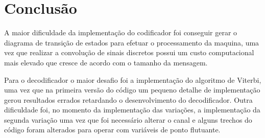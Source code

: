 \section{Conclusão}

A maior dificuldade da implementação do codificador foi conseguir gerar o diagrama de transição de estados para efetuar o processamento da maquina, uma vez que realizar a convolução de sinais discretos possui um custo computacional mais elevado que cresce de acordo com o tamanho da mensagem.

Para o decodificador o maior desafio foi a implementação do algoritmo de Viterbi, uma vez que na primeira versão do código um pequeno detalhe de implementação gerou resultados errados retardando o desenvolvimento do decodificador. Outra dificuldade foi, no momento da implementação das variações, a implementação da segunda variação uma vez que foi necessário alterar o canal e alguns trechos do código foram alterados para operar com variáveis de ponto flutuante.